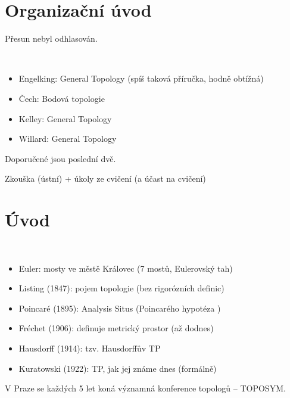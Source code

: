 \documentclass[12pt]{article}					%
\def\ibegin{\ \\[-3.8em]\hfill \phantom{x}}
\begin{document}
\section{Organizační úvod}
    Přesun nebyl odhlasován.

    \begin{poznamka}[Literatura]
        \ibegin
        \begin{itemize}
            \item Engelking: General Topology (spíš taková příručka, hodně obtížná)
            \item Čech: Bodová topologie
            \item Kelley: General Topology
            \item Willard: General Topology
        \end{itemize}
        Doporučené jsou poslední dvě.
    \end{poznamka}

    \begin{poznamka}
        Zkouška (ústní) + úkoly ze cvičení (a účast na cvičení)
    \end{poznamka}

\section{Úvod}

    \begin{poznamka}[Historie]
        \ibegin 
        \begin{itemize}
            \item Euler: mosty ve městě Královec (7 mostů, Eulerovský tah)
            \item Listing (1847): pojem topologie (bez rigorózních definic)
            \item Poincaré (1895): Analysis Situs (Poincarého hypotéza )
            \item Fréchet (1906): definuje metrický prostor (až dodnes)
            \item Hausdorff (1914): tzv. Hausdorffův TP
            \item Kuratowski (1922): TP, jak jej známe dnes (formálně)
        \end{itemize}
    \end{poznamka}

    \begin{poznamka}[TOPOSYM]
        V Praze se každých 5 let koná významná konference topologů -- TOPOSYM.
    \end{poznamka}
\end{document}
